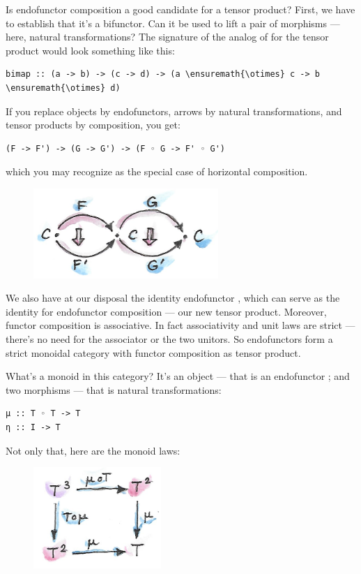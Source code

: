 Is endofunctor composition a good candidate for a tensor product? First,
we have to establish that it's a bifunctor. Can it be used to lift a
pair of morphisms --- here, natural transformations? The signature of
the analog of  for the tensor product would look something
like this:

\begin{Verbatim}[commandchars=\\\{\}]
bimap :: (a -> b) -> (c -> d) -> (a \ensuremath{\otimes} c -> b \ensuremath{\otimes} d)
\end{Verbatim}
If you replace objects by endofunctors, arrows by natural
transformations, and tensor products by composition, you get:

\begin{verbatim}
(F -> F') -> (G -> G') -> (F ◦ G -> F' ◦ G')
\end{verbatim}
which you may recognize as the special case of horizontal composition.

\begin{figure}[H]
\centering
\includegraphics[width=70mm]{images/horizcomp.png}
\end{figure}

\noindent
We also have at our disposal the identity endofunctor , which
can serve as the identity for endofunctor composition --- our new tensor
product. Moreover, functor composition is associative. In fact
associativity and unit laws are strict --- there's no need for the
associator or the two unitors. So endofunctors form a strict monoidal
category with functor composition as tensor product.

What's a monoid in this category? It's an object --- that is an
endofunctor ; and two morphisms --- that is natural
transformations:

\begin{verbatim}
μ :: T ◦ T -> T
η :: I -> T
\end{verbatim}
Not only that, here are the monoid laws:

\begin{figure}[H]
\centering
\includegraphics[width=1.90625in]{images/assoc.png}
\end{figure}

